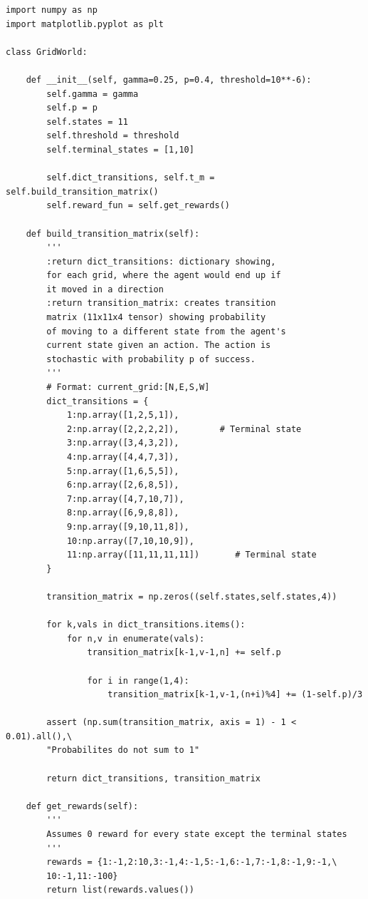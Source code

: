 \documentclass[12pt,twoside]{article}
\begin{document}
\begin{verbatim}
import numpy as np
import matplotlib.pyplot as plt

class GridWorld:

    def __init__(self, gamma=0.25, p=0.4, threshold=10**-6):
        self.gamma = gamma
        self.p = p
        self.states = 11
        self.threshold = threshold
        self.terminal_states = [1,10]

        self.dict_transitions, self.t_m = self.build_transition_matrix()
        self.reward_fun = self.get_rewards()

    def build_transition_matrix(self):
        '''
        :return dict_transitions: dictionary showing, 
        for each grid, where the agent would end up if 
        it moved in a direction
        :return transition_matrix: creates transition 
        matrix (11x11x4 tensor) showing probability 
        of moving to a different state from the agent's 
        current state given an action. The action is 
        stochastic with probability p of success.
        '''
        # Format: current_grid:[N,E,S,W]
        dict_transitions = {
            1:np.array([1,2,5,1]),
            2:np.array([2,2,2,2]),        # Terminal state
            3:np.array([3,4,3,2]),
            4:np.array([4,4,7,3]),
            5:np.array([1,6,5,5]),
            6:np.array([2,6,8,5]),
            7:np.array([4,7,10,7]),
            8:np.array([6,9,8,8]),
            9:np.array([9,10,11,8]),
            10:np.array([7,10,10,9]),
            11:np.array([11,11,11,11])       # Terminal state
        }

        transition_matrix = np.zeros((self.states,self.states,4))

        for k,vals in dict_transitions.items():
            for n,v in enumerate(vals):
                transition_matrix[k-1,v-1,n] += self.p        

                for i in range(1,4):
                    transition_matrix[k-1,v-1,(n+i)%4] += (1-self.p)/3        

        assert (np.sum(transition_matrix, axis = 1) - 1 < 0.01).all(),\
        "Probabilites do not sum to 1"

        return dict_transitions, transition_matrix

    def get_rewards(self):
        '''
        Assumes 0 reward for every state except the terminal states
        '''
        rewards = {1:-1,2:10,3:-1,4:-1,5:-1,6:-1,7:-1,8:-1,9:-1,\
        10:-1,11:-100}
        return list(rewards.values())


\end{verbatim}
\end{document}
